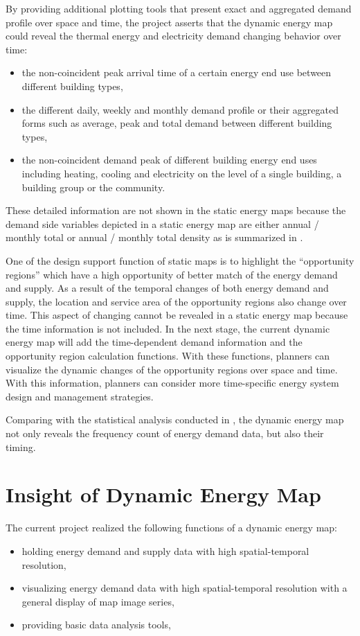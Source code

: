 By providing additional plotting tools that present exact and
aggregated demand profile over space and time, the project asserts
that the dynamic energy map could reveal the thermal energy and
electricity demand changing behavior over time:
\begin{itemize}
\item the non-coincident peak arrival time of a certain energy end use
  between different building types,
\item the different daily, weekly and monthly demand profile or their
  aggregated forms such as average, peak and total demand between
  different building types,
\item the non-coincident demand peak of different building energy end
  uses including heating, cooling and electricity on the level of
  a single building, a building group or the community.
\end{itemize}

These detailed information are not shown in the static energy maps
because the demand side variables depicted in a static energy map are
either annual / monthly total or annual / monthly total density as is
summarized in . 

One of the design support function of static maps is to highlight the
``opportunity regions'' which have a high opportunity of better match
of the energy demand and supply. As a result of the temporal changes
of both energy demand and supply, the location and service area of the
opportunity regions also change over time. This aspect of changing
cannot be revealed in a static energy map because the time information
is not included. In the next stage, the current dynamic energy map
will add the time-dependent demand information and the opportunity
region calculation functions. With these functions, planners can
visualize the dynamic changes of the opportunity regions over space
and time. With this information, planners can consider more
time-specific energy system design and management strategies.

Comparing with the statistical analysis conducted in ,
the dynamic energy map not only reveals the frequency count of energy
demand data, but also their timing. 

\section{Insight of Dynamic Energy Map}
The current project realized the following functions of a dynamic
energy map: 
\begin{itemize}
\item holding energy demand and supply data with high spatial-temporal
  resolution,
\item visualizing energy demand data with high spatial-temporal
  resolution with a general display of map image series,
\item providing basic data analysis tools,
\end{itemize}

